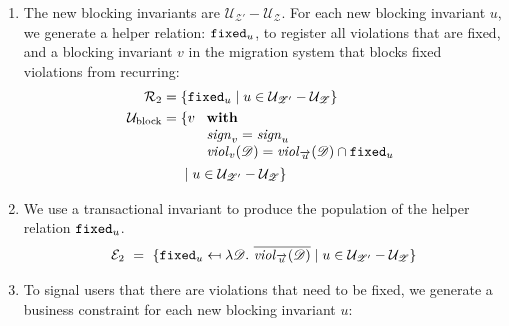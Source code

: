 \documentclass[runningheads]{llncs}
\newcommand{\id}[1]{\text{\it #1\/}}
\newcommand{\viol}[2]{\violC{#1}(#2)}
\newcommand{\violC}[1]{\id{viol}_{#1}}
\newcommand{\sign}[1]{\id{sign}_{#1}}
\newcommand{\rels}{\mathcal{R}}   %
\newcommand{\rules}{\mathcal{U}}
\newcommand{\transactions}{\mathcal{E}}
\newcommand{\dataset}{\mathscr{D}}
\newcommand{\schema}{\mathscr{Z}}
\newcommand{\migrsys}{\mathscr{M}}
\newcommand{\cmpl}[1]{\overline{#1}}
\begin{document}
\begin{enumerate}
\item\label{step3}
   The new blocking invariants are $\rules_{\schema'}-\rules_{\schema}$.
   For each new blocking invariant $u$, we generate a helper relation: ${\tt fixed}_u$, to register all violations that are fixed,
   and a blocking invariant $v$ in the migration system that blocks fixed violations from recurring:
   \begin{align}
      \rels_2={}&\{{\tt fixed}_u\mid u \in \rules_{\schema'}-\rules_{\schema}\}\\
      \rules_\text{block}={}&\{v\ 
      \begin{array}[t]{l}
         \text{\bf with}\\
         \sign{v}=\sign{u}\\
         \viol{v}{\dataset}=\viol{\overrightarrow{u}}{\dataset}\cap{\tt fixed}_u
      \end{array}\label{eqn:blockRule}\\
      &\mid u\in\rules_{\schema'}-\rules_{\schema}\}\notag
   \end{align}
\item\label{step4}
   We use a transactional invariant to produce the population of the helper relation ${\tt fixed}_u$.
   \begin{equation}
     \transactions_2\ =\ \{{\tt fixed}_u\mapsfrom\lambda\dataset.~\cmpl{\viol{\overrightarrow{u}}{\dataset}}\mid u\in\rules_{\schema'}-\rules_{\schema}\}\label{eqn:enforceForRules}
   \end{equation}
\item\label{step5} To signal users that there are violations that need to be fixed, we generate a business constraint for each new blocking invariant $u$:

\end{enumerate}
\end{document}
